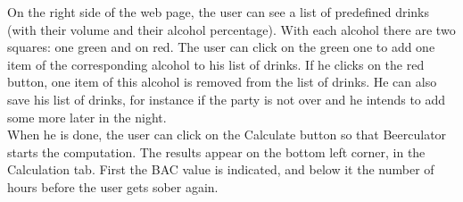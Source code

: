 On the right side of the web page, the user can see a list of predefined drinks (with their volume and their alcohol percentage). With each alcohol there are two squares: one green and on red. The user can click on the green one to add one item of the corresponding alcohol to his list of drinks. If he clicks on the red button, one item of this alcohol is removed from the list of drinks. He can also save his list of drinks, for instance if the party is not over and he intends to add some more later in the night.\\

When he is done, the user can click on the \guillemotleft{} Calculate \guillemotright{} button so that Beerculator starts the computation. The results appear on the bottom left corner, in the \guillemotleft{} Calculation \guillemotright{} tab. First the BAC value is indicated, and below it the number of hours before the user gets sober again.
